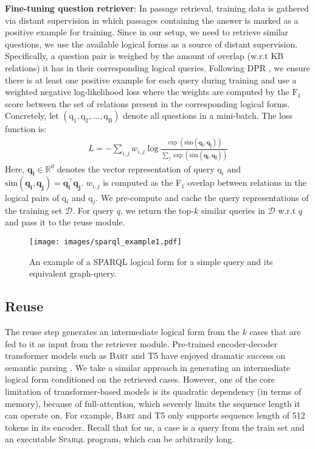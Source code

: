 \documentclass[11pt]{article}
\newcommand{\spql}{\textsc{Sparql}\xspace}
\begin{document}
\textbf{Fine-tuning question retriever}: In passage retrieval, training data is gathered via distant supervision in which passages containing the answer is marked as a positive example for training. Since in our setup, we need to retrieve similar questions, we use the available logical forms as a source of distant supervision. Specifically, a question pair is weighed by the amount of overlap (w.r.t KB relations) it has in their corresponding logical queries. Following DPR \cite{karpukhin2020dense}, we ensure there is at least one positive example for each query during training and use a weighted negative log-likelihood loss where the weights are computed by the $\textrm{F}_1$ score between the set of relations present in the corresponding logical forms. Concretely, let $(\textrm{q}_1, \textrm{q}_2, \ldots, \textrm{q}_\textrm{B})$ denote all questions in a mini-batch. The loss function is:
\begin{align*}
    L = - \sum_{i, j}w_{i,j}\log\frac{\exp(\mathrm{sim}(\mathbf{q_i, q_j}))}{\sum_{j}\exp(\mathrm{sim}(\mathbf{q_i, q_j}))}
\end{align*}
Here, $\mathbf{q_i} \in \mathbb{R}^{d}$ denotes the vector representation of query 
$\textrm{q}_i$ and $\mathrm{sim}(\mathbf{q_i, q_j}) = \mathbf{q_i^\top} \mathbf{q_j}$. 
$w_{i,j}$ is computed as the F$_{1}$ overlap between relations in the logical pairs of q$_i$ and q$_j$.
We pre-compute and cache the query representations of the training set $\mathcal{D}$. For query $q$, we return the top-$k$ similar queries in $\mathcal{D}$ w.r.t $q$ and pass it to the reuse module.

\begin{figure}
    \centering
    \texttt{[image: images/sparql\_example1.pdf]}
    \vspace{-5mm}
    \caption{An example of a SPARQL logical form for a simple query and its equivalent graph-query.}
    \label{fig:sparql_example}
\end{figure}

\subsection{Reuse}
\label{sub:reuse}
The reuse step generates an intermediate logical form from the $k$ cases that are fed to it as input from the retriever module. Pre-trained encoder-decoder transformer models such as \textsc{Bart} \cite{lewis-etal-2020-bart} and T5 \cite{t5} have enjoyed dramatic success on semantic parsing \cite{lin2018nl2bash,hwang2019comprehensive,shaw2020compositional,suhr2020exploring}. We take a similar approach in generating an intermediate logical form conditioned on the retrieved cases. However, one of the core limitation of transformer-based models is its quadratic dependency (in terms of memory), because of full-attention, which severely limits the sequence length it can operate on. For example, \textsc{Bart} and T5 only supports sequence length of 512 tokens in its encoder. Recall that for us, a case is a query from the train set and an executable \spql program, which can be arbitrarily long.   
\end{document}
